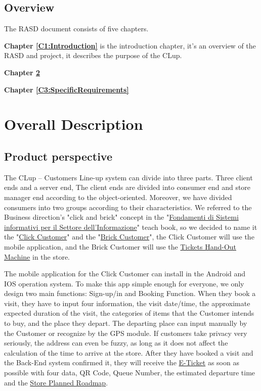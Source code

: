 \documentclass[a4paper,12pt]{report}
\begin{document}
\section{Overview}
The RASD document consists of five chapters.

\textbf{Chapter \ref{C1:Introduction}} is the introduction chapter, it's an overview of the RASD and project, 
it describes the purpose of the CLup.

\textbf{Chapter \ref{C2:OverallDescription}} 

\textbf{Chapter \ref{C3:SpecificRequirements}} 


\chapter{Overall Description} \label{C2:OverallDescription}
\section{Product perspective}

The CLup – Customers Line-up system can divide into three parts. Three client ends and a server end, The client ends are divided into consumer end and store manager end according to the object-oriented. Moreover, we have divided consumers into two groups according to their characteristics. We referred to the Business direction's "click and brick" concept in the "\hyperref[Reference documents]{Fondamenti di Sistemi informativi per il Settore dell'Informazione}" teach book, so we decided to name it the "\hyperref[Definitions]{Click Customer}" and the "\hyperref[Definitions]{Brick Customer}", the Click Customer will use the mobile application, and the Brick Customer will use the \hyperref[Definitions]{Tickets Hand-Out Machine} in the store.

The mobile application for the Click Customer can install in the Android and IOS operation system. To make this app simple enough for everyone, we only design two main functions: Sign-up/in and Booking Function. When they book a visit, they have to input four information, the visit date/time, the approximate expected duration of the visit, the categories of items that the Customer intends to buy, and the place they depart. The departing place can input manually by the Customer or recognize by the GPS module. If customers take privacy very seriously, the address can even be fuzzy, as long as it does not affect the calculation of the time to arrive at the store. After they have booked a visit and the Back-End system confirmed it, they will receive the \hyperref[Definitions]{E-Ticket} as soon as possible with four data, QR Code, Queue Number, the estimated departure time and the \hyperref[Definitions]{Store Planned Roadmap}. 
\end{document}
